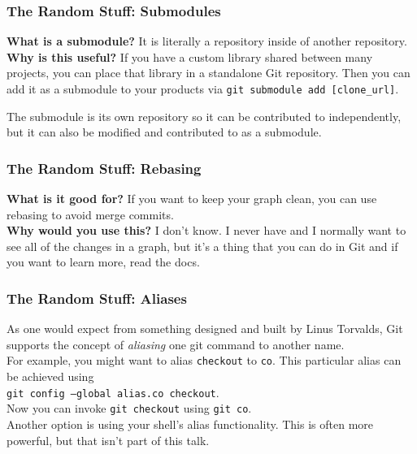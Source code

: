 \documentclass{lug}
\begin{document}
\begin{frame}
    \frametitle{The Random Stuff: Submodules}

    \textbf{What is a submodule?} It is literally a repository inside of another repository.\\

    \textbf{Why is this useful?} If you have a custom library shared between many projects, you can
    place that library in a standalone Git repository. Then you can add it as a submodule to your
    products via \texttt{git submodule add [clone\_url]}.

    The submodule is its own repository so it can be contributed to independently, but it can also
    be modified and contributed to as a submodule.
\end{frame}

\begin{frame}
    \frametitle{The Random Stuff: Rebasing}

    \textbf{What is it good for?} If you want to keep your graph clean, you can use rebasing to
    avoid merge commits.\\

    \textbf{Why would you use this?} I don't know. I never have and I normally want to see all of
    the changes in a graph, but it's a thing that you can do in Git and if you want to learn more,
    read the docs.
\end{frame}

\begin{frame}
    \frametitle{The Random Stuff: Aliases}

    As one would expect from something designed and built by Linus Torvalds, Git supports the
    concept of \textit{aliasing} one git command to another name.\\

    For example, you might want to alias \texttt{checkout} to \texttt{co}. This particular alias can
    be achieved using \\ \texttt{git config --global alias.co checkout}.\\

    Now you can invoke \texttt{git checkout} using \texttt{git co}.\\

    Another option is using your shell's alias functionality. This is often more powerful, but that
    isn't part of this talk.
\end{frame}
\end{document}

